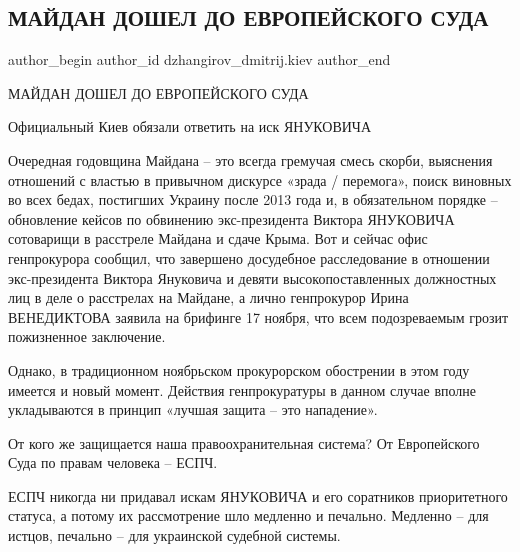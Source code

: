  
 
 
 
 
 
\subsection{МАЙДАН ДОШЕЛ ДО ЕВРОПЕЙСКОГО СУДА}
\label{sec:24_11_2021.fb.dzhangirov_dmitrij.kiev.1.maidan_evrosud}
 
\ifcmt
 author_begin
   author_id dzhangirov_dmitrij.kiev
 author_end
\fi

МАЙДАН ДОШЕЛ ДО ЕВРОПЕЙСКОГО СУДА

Официальный Киев обязали ответить на иск ЯНУКОВИЧА 

Очередная годовщина Майдана – это всегда гремучая смесь скорби, выяснения
отношений с властью в привычном дискурсе «зрада / перемога», поиск виновных во
всех бедах, постигших Украину после 2013 года и, в обязательном порядке –
обновление кейсов по обвинению экс-президента Виктора ЯНУКОВИЧА сотоварищи в
расстреле Майдана и сдаче Крыма. Вот и сейчас офис генпрокурора сообщил, что
завершено досудебное расследование в отношении экс-президента Виктора Януковича
и девяти высокопоставленных должностных лиц в деле о расстрелах на Майдане, а
лично генпрокурор Ирина ВЕНЕДИКТОВА заявила на брифинге 17 ноября, что всем
подозреваемым грозит пожизненное заключение. 

Однако, в традиционном ноябрьском прокурорском обострении в этом году имеется и
новый момент. Действия генпрокуратуры в данном случае вполне укладываются в
принцип «лучшая защита – это нападение».

От кого же защищается наша правоохранительная система? От Европейского Суда по
правам человека – ЕСПЧ.   

ЕСПЧ никогда ни придавал искам ЯНУКОВИЧА и его соратников приоритетного
статуса, а потому их рассмотрение шло медленно и печально. Медленно – для
истцов, печально – для украинской судебной системы. 

